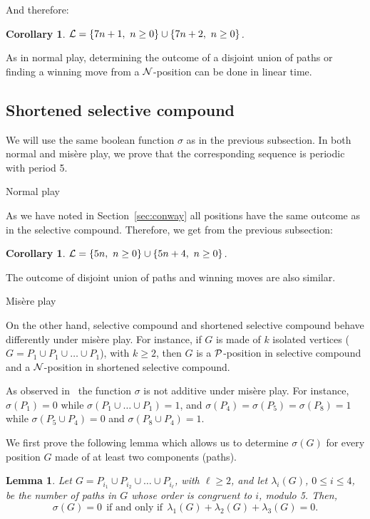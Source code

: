 \documentclass[11pt]{article}
\newcommand{\centre}[1]{\begin{center}#1\end{center}}
\newcommand{\NN}{{\cal N}}
\newcommand{\PP}{{\cal P}}
\newcommand{\LL}{{\cal L}}
\newtheorem{lemma}[theorem]{Lemma}
\newtheorem{corollary}[theorem]{Corollary}
\begin{document}
And therefore:

\begin{corollary}
$\LL=\{7n+1,\ n\ge 0\}\cup\{7n+2,\ n\ge 0\}$.
\end {corollary}

As in normal play, determining the outcome of a disjoint union
of paths or finding a winning move from a $\NN$-position can be done
in linear time.

\subsection{Shortened selective compound}

We will use the same boolean function $\sigma$ as in
the previous subsection.
In both normal and mis\`ere play, we prove that
the corresponding sequence is periodic
with period 5.
\vskip 4mm

\centre{{\sc Normal play}}

As we have noted in Section~\ref{sec:conway} all positions have the same
outcome as in the selective compound. Therefore, we get from
the previous subsection:

\begin{corollary}
$\LL=\{5n,\ n\ge 0\}\cup\{5n+4,\ n\ge 0\}$.
\end {corollary}

The outcome of disjoint union of paths and winning moves are also similar.

\vskip 4mm

\centre{{\sc Mis\`ere play}}

On the other hand, selective compound and shortened selective
compound behave differently under mis\`ere play.
For instance, if $G$ is made of $k$ isolated vertices
($G=P_1\cup P_1\cup\dots\cup P_1$), with $k\ge 2$, then
$G$ is a $\PP$-position in selective compound and a
$\NN$-position in shortened selective compound.

As observed in~\cite[Chapter~14]{ONAG} the function $\sigma$
is not additive under mis\`ere play.
For instance, $\sigma(P_1)=0$ while  
$\sigma(P_1\cup\dots\cup P_1)=1$,
and $\sigma(P_4)=\sigma(P_5)=\sigma(P_8)=1$ while $\sigma(P_5\cup P_4)=0$
and $\sigma(P_8\cup P_4)=1$.

We first prove the following lemma which allows us to determine
$\sigma(G)$ for every position $G$ made of at least two
components (paths).

\begin{lemma}
Let $G=P_{i_1}\cup P_{i_2}\cup\dots\cup P_{i_\ell}$, with $\ell\ge 2$, and
let $\lambda_i(G)$, $0\le i\le 4$, be the number of paths in $G$ whose
order is congruent to $i$, modulo 5. Then,\\
$$\sigma(G)=0\ \ \mbox{if and only if} \ \ 
\lambda_1(G)+\lambda_2(G)+\lambda_3(G)=0.$$
\label{lemma:sigma}
\end{lemma}
\end{document}
